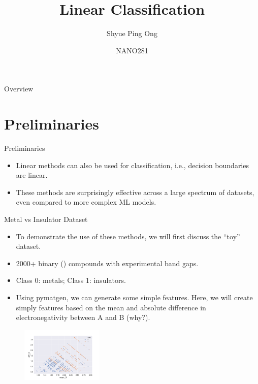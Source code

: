 \documentclass[aspectratio=169]{beamer}
\title[Linear Classification]{Linear Classification}
\author{Shyue Ping Ong}
\institute[UCSD]{University of California, San Diego\\
\medskip
}
\date{NANO281} %
\begin{document}
\begin{frame}
    \titlepage %
\end{frame}


\begin{frame}{Overview}
    \tableofcontents
\end{frame}


\section{Preliminaries}

\begin{frame}{Preliminaries}
    \begin{itemize}
        \item Linear methods can also be used for classification, i.e., decision boundaries are linear.
        \item These methods are surprisingly effective across a large spectrum of datasets, even compared to more complex ML models.
    \end{itemize}
\end{frame}


\begin{frame}{Metal vs Insulator Dataset}
    \begin{itemize}
        \item To demonstrate the use of these methods, we will first discuss the ``toy'' dataset.
        \item 2000+ binary () compounds with experimental band gaps.
        \item Class 0: metals; Class 1: insulators.
        \item Using pymatgen, we can generate some simple features. Here, we will create simply features based on the mean and absolute difference in electronegativity between A and B (why?).
    \end{itemize}
    \begin{figure}
        \centering
        \includegraphics[width=0.35\textwidth]{figures/electronnegativity_bandgap.png}
    \end{figure}
\end{frame}
\end{document}
